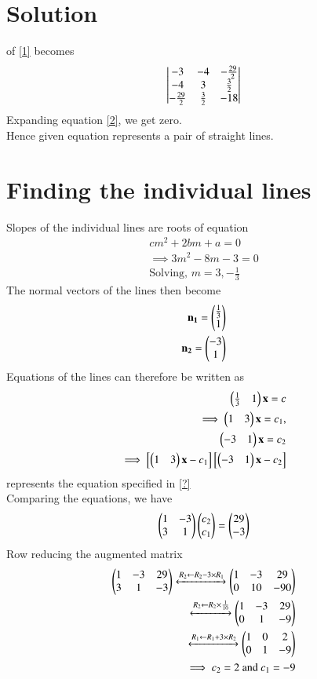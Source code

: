 \documentclass[journal,12pt,twocolumn]{IEEEtran}
\begin{document}
\section{Solution}
 of \eqref{1} becomes
\begin{align}
    \begin{vmatrix}-3&-4&-\frac{29}{2}\\-4&3&\frac{3}{2}\\-\frac{29}{2}&\frac{3}{2}&-18\end{vmatrix}\label{2}
\end{align}
Expanding equation \eqref{2}, we get zero.\\
Hence given equation represents a pair of straight lines.
\section{Finding the individual lines}
Slopes of the individual lines are roots of equation 
\begin{align}
    cm^2+2bm+a=0\\
    \implies 3m^2-8m-3=0\\
    \text{Solving, }m=3,-\frac{1}{3}
\end{align}
The normal vectors of the lines then become
\begin{align}
    \mathbf{n_1}=\begin{pmatrix}\frac{1}{3}\\1\end{pmatrix}\\
    \mathbf{n_2}=\begin{pmatrix}-3\\1\end{pmatrix}
\end{align}
Equations of the lines can therefore be written as
\begin{align}
  \begin{pmatrix}\frac{1}{3}&1\end{pmatrix}\mathbf{x}=c\\
 \implies \begin{pmatrix}1&3\end{pmatrix}\mathbf{x}=c_1 ,\\
   \begin{pmatrix}-3&1\end{pmatrix}\mathbf{x}=c_2\\
  \implies \left[\begin{pmatrix}1&3\end{pmatrix}\mathbf{x}-c_1\right]\left[\begin{pmatrix}-3&1\end{pmatrix}\mathbf{x}-c_2\right]
\end{align}
represents the equation specified in \ref{?}\\
Comparing the equations, we have
\begin{align}
    \begin{pmatrix}1&-3\\3&1\end{pmatrix}\begin{pmatrix}c_2\\c_1\end{pmatrix}=\begin{pmatrix}29\\-3\end{pmatrix}\\
 \end{align}
 Row reducing the augmented matrix
 \begin{align}
    \begin{pmatrix}1&-3&29\\3&1&-3\end{pmatrix}\xleftrightarrow[]{R_2\leftarrow R_2-3\times R_1}
    \begin{pmatrix}1&-3&29\\0&10&-90\end{pmatrix}\\
    \xleftrightarrow[]{R_2\leftarrow R_2\times \frac{1}{10}}
    \begin{pmatrix}1&-3&29\\0&1&-9\end{pmatrix}\\
    \xleftrightarrow[]{R_1\leftarrow R_1+3\times R_2}
    \begin{pmatrix}1&0&2\\0&1&-9\end{pmatrix}\\
    \implies c_2=2 \text{ and }c_1=-9
\end{align}
\end{document}
